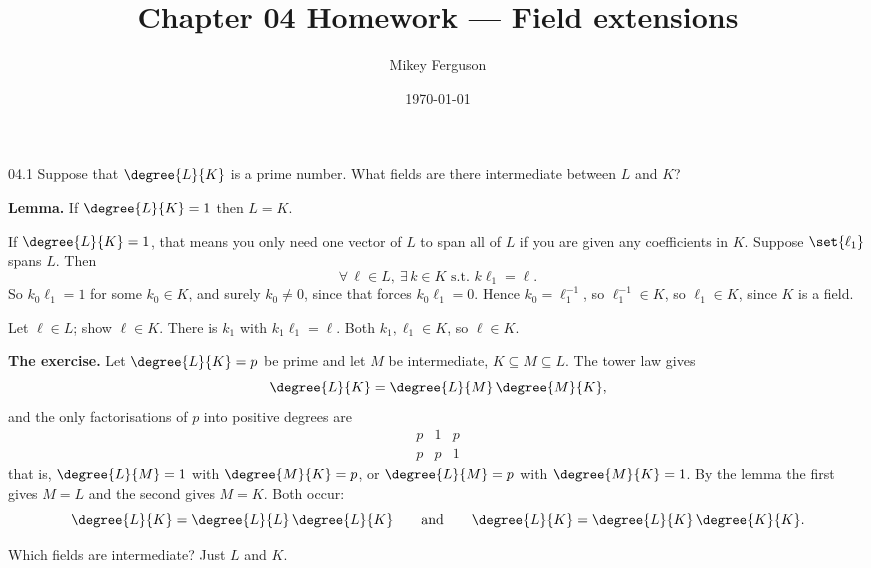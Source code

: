 \documentclass[11pt]{article}
\title{Chapter 04 Homework --- Field extensions}
\author{Mikey Ferguson}
\date{\today}
\begin{document}
\maketitle


\begin{problem}{04.1}
  Suppose that $\degree{L}{K}$ is a prime number. What fields are there
  intermediate between $L$ and $K$?
\end{problem}
\begin{solution}
  \textbf{Lemma.} If $\degree{L}{K} = 1$ then $L = K$.

  If $\degree{L}{K} = 1$, that means you only need one vector of $L$ to span
  all of $L$ if you are given any coefficients in $K$. Suppose $\set{\ell_{1}}$
  spans $L$. Then
  \[
    \forall\, \ell \in L,\ \exists\, k \in K \text{ s.t. } k\ell_{1} = \ell .
  \]
  So $k_{0}\ell_{1} = 1$ for some $k_{0} \in K$, and surely $k_{0} \neq 0$,
  since that forces $k_{0}\ell_{1} = 0$. Hence $k_{0} = \ell_{1}^{-1}$, so
  $\ell_{1}^{-1} \in K$, so $\ell_{1} \in K$, since $K$ is a field.

  Let $\ell \in L$; show $\ell \in K$. There is $k_{1}$ with
  $k_{1}\ell_{1} = \ell$. Both $k_{1}, \ell_{1} \in K$, so $\ell \in K$.

  \medskip
  \textbf{The exercise.} Let $\degree{L}{K} = p$ be prime and let $M$ be
  intermediate, $K \subseteq M \subseteq L$. The tower law gives
  \[
    \degree{L}{K} = \degree{L}{M}\,\degree{M}{K},
  \]
  and the only factorisations of $p$ into positive degrees are
  \[
    \begin{array}{ccc}
      p & 1 & p \\
      p & p & 1
    \end{array}
  \]
  that is, $\degree{L}{M} = 1$ with $\degree{M}{K} = p$, or $\degree{L}{M} = p$
  with $\degree{M}{K} = 1$. By the lemma the first gives $M = L$ and the
  second gives $M = K$. Both occur:
  \[
    \degree{L}{K} = \degree{L}{L}\,\degree{L}{K}
    \qquad\text{and}\qquad
    \degree{L}{K} = \degree{L}{K}\,\degree{K}{K}.
  \]

  Which fields are intermediate? Just $L$ and $K$.
\end{solution}
\end{document}

